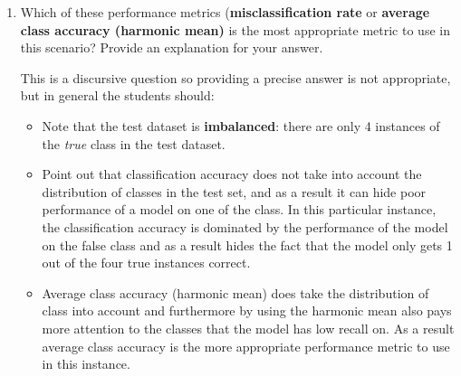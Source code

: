 \documentclass[nosolution]{ditpaper}
\begin{document}
\begin{enumerate}
\begin{enumerate}
\item Which of these performance metrics (\textbf{misclassification rate} or \textbf{average class accuracy (harmonic mean)} is the most appropriate metric to use in this scenario? Provide an explanation for your answer.
	\begin{answer}
This is a discursive question so providing a precise answer is not appropriate, but in general the students should:
	\begin{itemize}
		\item Note that the test dataset is \textbf{imbalanced}: there are only 4 instances of the \textit{true} class in the test dataset.
		\item Point out that classification accuracy does not take into account the distribution of classes in the test set, and as a result it can hide poor performance of a model on one of the class. In this particular instance, the classification accuracy is dominated by the performance of the model on the false class and as a result hides the fact that the model only gets 1 out of the four true instances correct.
		\item Average class accuracy (harmonic mean) does take the distribution of class into account and furthermore by using the harmonic mean also pays more attention to the classes that the model has low recall on. As a result average class accuracy is the more appropriate performance metric to use in this instance. 
	\end{itemize}
	\end{answer}
	\end{enumerate}
\end{enumerate} 
\end{document}
